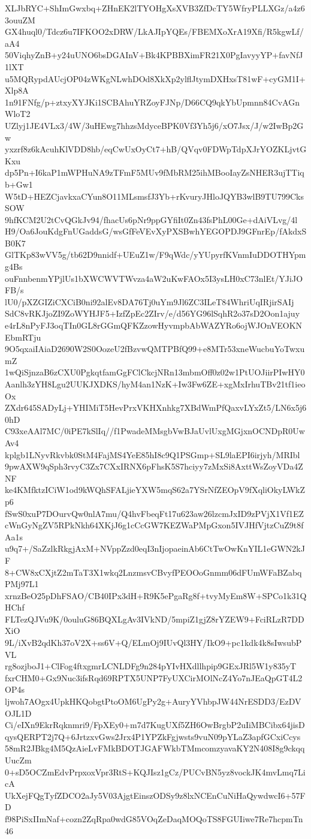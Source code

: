XLJbRYC+ShImGwxbq+ZHnEK2lTYOHgXsXVB3ZfDcTY5WfryPLLXGz/a4z63ouuZM
GX4huql0/Tdcz6u7IFKOO2xDRW/LkAJIpYQEs/FBEMXoXrA19Xfi/R5kgwLf/aA4
50ViqhyZnB+y24uUNO6bsDGAInV+Bk4KPBBXimFR21X0PgIavyyYP+favNfJ1lXT
u5MQRypdAUcjOP04zWKgNLwhDOd8XkXp2ylflJtymDXHxsT81wF+cyGM1I+Xlp8A
1n91FNfg/p+ztxyXYJKi1SCBAhuYRZoyFJNp/D66CQ9qkYbUpmnn84CvAGnWloT2
UZlyj1JE4VLx3/4W/3uHEwg7hhzsMdyceBPK0Vf3Yh5j6/xO7Jsx/J/w2IwBp2Gw
yxzrf8z6kAcuhKlVDD8hb/eqCwUxOyCt7+hB/QVqv0FDWpTdpXJrYOZKLjvtGKxu
dp5Pn+I6kaP1mWPHuNA9zTFmF5MUv9fMbRM25ihMBooIayZsNHER3ujTTiqb+Gw1
W5tD+HEZCjavkxaCYun8O11MLsmsfJ3Yb+rKvuryJHloJQYB3wlB9TU799CksSOW
9hfKCM2U2tCvQGkJv94/fhacUs6pNr9ppGYfiIt0Zn43fsPhL00Ge+dAiVLvg/4l
H9/Oa6JouKdgFnUGaddsG/wsGfFeVEvXyPXSBwhYEGOPDJ9GFnrEp/fAkdxSB0K7
GlTKp83wVV5g/tb62D9nnidf+UEuZ1w/F9qWdc/yYUpyrfKVnmIuDDOTHYpmg4Bs
ouFnnbenmYPjlUs1bXWCWVTWvza4aW2uKwFAOx5I3ysLH0xC73nlEt/YJiJOFB/s
lU0/pXZGIZiCXCiB0ni92alEv8DA76Tj0uYm9Jl6ZC3ILeT84WhriUqIRjirSAIj
SdC8vRKJjoZI9ZoWYHJF5+IzfZpEc2ZIrv/e/d56YG96lSqhR2o37sD2Oon1ajuy
e4rL8nPyFJ3oqTIn0GL8rGGmQFKZzowHyvmpbAbWAZYRo6ojWJOnVEOKNEbmRTju
9O5qxaiIAiaD2690W2S0OozeU2fBzvwQMTPBfQ99+e8MTr53xneWucbuYoTwxumZ
1wQiSjnzaB6zCXU0PgkqtfamGgFClCkcjNRn13mbmOff0z02w1PtUOJiirPIwHY0
Aanlh3zYH8Lgu2UUKJXDKS/hyM4an1NzK+Iw3Fw6ZE+xgMxIrhuTBv21tf1ieoOx
ZXdr645SADyLj+YHIMiT5HevPrxVKHXnhkg7XBdWmPfQaxvLYxZt5/LN6x5j60hD
C93xeAAl7MC/0iPE7kSlIq//f1PwadeMMsgbVwBJaUvlUxgMGjxnOCNDpR0UwAv4
kplgb1LNyvRkvbk0StM4FajMS4YeE85hI8c9Q1PSGmp+SL9laEPI6irjyh/MRIbl
9pwAXW9qSph3rvyC3Zx7CXxIRNX6pFhsK5S7hciyy7zMxSi8AxttWsZoyVDa4ZNF
ke4KMfktzICiW1od9kWQhSFALjieYXW5mqS62a7YSrNfZEOpV9fXqliOkyLWkZp6
fSwS0xuP7DOurvQw0nlA7mu/Q4hvFbeqFt17u623aw26lzcmJxID9zPVjX1Vf1EZ
cWnGyNgZV5RPkNkh64XKjJ6g1cCcGW7KEZWaPMpGxon5IVJHfVjtzCuZ9t8fAa1s
u9q7+/SaZzlkRkgjAxM+NVppZzd0eqI3nIjopaeinAb6CtTwOwKnYIL1eGWN2kJF
8+CW8xCXjtZ2mTaT3X1wkq2LnzmsvCBvyfPEOOoGnmm06dFUmWFaBZabqPMj97L1
xrnzBeO25pDhFSAO/CB40IPx3dH+R9K5ePgaRg8f+tvyMyEm8W+SPCo1k31QHChf
FLTezQJVu9K/0ouluG86BQXLgAv3IVkND/5mpiZ1gjZ8rYZEW9+FciRLzR7DDXiO
9L/iXvB2qdKh37oV2X+ss6V+Q/ELmOj9IUvQl3HY/IkO9+pc1kdk4k8sIwsubPVL
rg8ozjboJ1+ClFog4ftxgmrLCNLDFg9n284pYIvHXdllhpip9GExJRl5W1y835yT
fxrCHM0+Gx9Nuc3ifsRqd69RPTX5UNP7FyUXCirMOlNcZ4Yo7nJEaQpGT4L2OP4s
ljwoh7AOgx4UpkHKQobgtPtoOM6UgPy2g+AuryYVhbpJW44NrESDD3/EzDVOJL1D
Ci/eIXn9EkrRqknmri9/FpXEy0+m7d7KugUXf5ZH6OwBrgbP2uIiMBCibx64jisD
qysQERPT2j7Q+6JrtzxvGws2Jrx4P1YPZkFgjwsts9vuN09pYLaZ3apfGCxiCcys
58mR2JBkg4M5QzAieLvFMkBDOTJGAFWkbTMmcomzyavaKY2N408I8g9ckqqUucZm
0+sD5OCZmEdvPrpxoxVpr3RtS+KQJIsz1gCz/PUCvBN5yz8vockJK4mvLmq7LicA
UkXejFQgTyfZDCO2aJy5V03AjgtEinszODSy9z8lxNCEnCuNiHaQywdwcI6+57FD
f98PiSxIImNaf+cozn2ZqRpa0wdG85VOqZeDaqMOQoTS8FGUIiwe7Re7hcpmTn46
